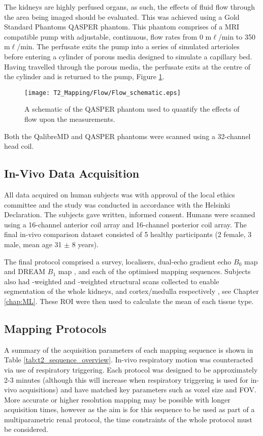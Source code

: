 The kidneys are highly perfused organs, as such, the effects of fluid flow through the area being imaged should be evaluated. This was achieved using a Gold Standard Phantoms \ac{QASPER} phantom. This phantom comprises of a \ac{MRI} compatible pump with adjustable, continuous, flow rates from 0 m$\ell$/min to 350 m$\ell$/min. The perfusate exits the pump into a series of simulated arterioles before entering a cylinder of porous media designed to simulate a capillary bed. Having travelled through the porous media, the perfusate exits at the centre of the cylinder and is returned to the pump, Figure \ref{fig:t2_flow_phantom_schematic}. 

\begin{figure}[H]
	\centering
	\texttt{[image: T2\_Mapping/Flow/Flow\_schematic.eps]}
	\caption{A schematic of the \ac{QASPER} phantom used to quantify the effects of flow upon the \ttwo measurements.}
	\label{fig:t2_flow_phantom_schematic}	
\end{figure}

Both the QalibreMD and \ac{QASPER} phantoms were scanned using a 32-channel head coil. 

\subsection{In-Vivo Data Acquisition}
All data acquired on human subjects was with approval of the local ethics committee and the study was conducted in accordance with the Helsinki Declaration. The subjects gave written, informed consent. Humans were scanned using a 16-channel anterior coil array and 16-channel posterior coil array. The final in-vivo comparison dataset consisted of 5 healthy participants (2 female, 3 male, mean age 31 $\pm$ 8 years).

The final protocol comprised a survey, localisers, dual-echo gradient echo $B_0$ map and \ac{DREAM} $B_1$ map \cite{nehrke_dreamnovel_2012}, and each of the optimised \ttwo mapping sequences. Subjects also had \ttwo-weighted and \tone-weighted structural scans collected to enable segmentation of the whole kidneys, and cortex/medulla respectively \cite{petzold_building_2014, will_automated_2014}, see Chapter \ref{chap:ML}. These \ac{ROI} were then used to calculate the mean \ttwo of each tissue type. 

\subsection{\ttwo Mapping Protocols}
\label{subsec:t2_acq_schemes}
A summary of the acquisition parameters of each \ttwo mapping sequence is shown in Table \ref{tab:t2_sequence_overview}. In-vivo respiratory motion was counteracted via use of respiratory triggering. Each protocol was designed to be  approximately 2-3 minutes (although this will increase when respiratory triggering is used for in-vivo acquisitions) and have matched key parameters such as voxel size and \ac{FOV}. More accurate or higher resolution \ttwo mapping may be possible with longer acquisition times, however as the aim is for this sequence to be used as part of a multiparametric renal protocol, the time constraints of the whole protocol must be considered. 

